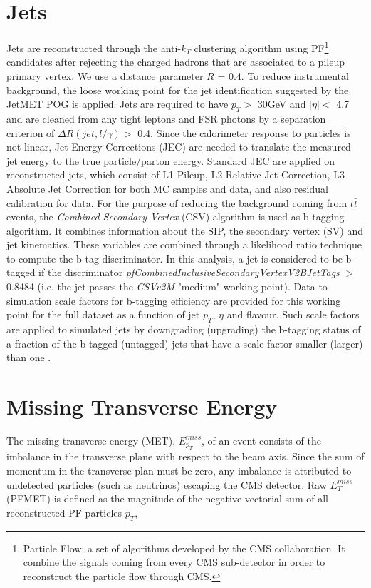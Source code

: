 \section{Jets}
Jets are reconstructed through the anti-$k_{T}$ clustering algorithm using PF\footnote{Particle Flow: a set of algorithms developed by the CMS collaboration. It combine the signals coming from every CMS sub-detector in order to reconstruct the particle flow through CMS.} candidates after rejecting the charged hadrons that are associated to a pileup primary vertex. We use a distance parameter $R$ = 0.4. To reduce instrumental background, the loose working point for the jet identification suggested by the JetMET POG is applied. Jets are required to have $p_{T}>$ 30GeV and $|\eta|<$ 4.7 and are cleaned from any tight leptons and FSR photons by a separation criterion of $\Delta R(jet,l/\gamma)>$ 0.4. Since the calorimeter response to particles is not linear, Jet Energy Corrections (JEC) are needed to translate the measured jet energy to the true particle/parton energy. Standard JEC are applied on reconstructed jets, which consist of L1 Pileup, L2 Relative Jet Correction, L3 Absolute Jet Correction for both MC samples and data, and also residual calibration for data. For the purpose of reducing the background coming from $t\bar{t}$ events, the \textit{Combined Secondary Vertex} (CSV) algorithm is used as b-tagging algorithm. It combines information about the SIP, the secondary vertex (SV) and jet kinematics. These variables are combined through a likelihood ratio technique to compute the b-tag discriminator. In this analysis, a jet is considered to be b-tagged if the discriminator \textit{pfCombinedInclusiveSecondaryVertexV2BJetTags} $>$ 0.8484 (i.e. the jet passes the \textit{CSVv2M} "medium" working point). Data-to-simulation scale factors for b-tagging efficiency are provided for this working point for the full dataset as a function of jet $p_{T}$, $\eta$ and flavour. Such scale factors are applied to simulated jets by downgrading (upgrading) the b-tagging status of a fraction of the b-tagged (untagged) jets that have a scale factor smaller (larger) than one \cite{bib:CMS-AN-15-277,bib:CMS-AN-16-442}.

\section{Missing Transverse Energy}
The missing transverse energy (MET), $E_{p_{T}}^{miss}$, of an event
consists of the imbalance in the transverse plane with respect to the beam axis. Since the sum of momentum in the transverse plan must be zero, any imbalance is attributed to undetected particles (such as neutrinos) escaping the CMS detector. Raw $E_{T}^{miss}$ (PFMET) is defined as the magnitude of the negative vectorial sum of all reconstructed PF particles $p_{T}$,

